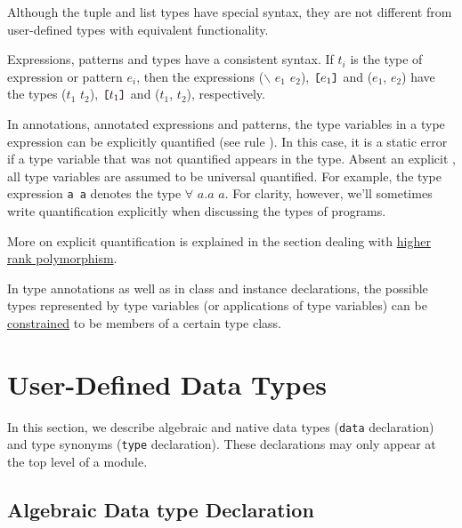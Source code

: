 Although the tuple and list types have special syntax, they are not different from user-defined types with equivalent functionality.


Expressions, patterns and types have a consistent syntax. If $t_i$ is the type of expression or pattern $e_i$, then the expressions
($\backslash$ $e_1$ \arrow{} $e_2$),
$\bracka{}e_1\brackz{}$
and ($e_1$, $e_2$) have the types
($t_1$ \arrow{} $t_2$), $\bracka{}t_1\brackz{}$ and ($t_1$, $t_2$),
respectively.

In annotations, annotated expressions and patterns, the type variables in a type expression can be explicitly  quantified (see rule ). In this case, it is a static error if a type variable that was not quantified appears in the type.
Absent an explicit , all type variables are assumed to be universal quantified. For example, the type expression \texttt{a \arrow{} a} denotes the type $\forall$ $a$.$a$ \arrow{} $a$.
For clarity, however, we'll sometimes write quantification explicitly when discussing the types of \frege{} programs.

More on explicit quantification is explained in the section dealing with \hyperref[higher-rank]{higher rank polymorphism}.

In type annotations as well as in class and instance declarations, the possible types represented by type variables (or applications of type variables) can be \hyperref[constraint]{constrained} to be members of a certain type class. 

\section{User-Defined Data Types}   

In this section, we describe algebraic and native data types (\texttt{data} declaration) and type synonyms (\texttt{type} declaration). These declarations may only appear at the top level of a module.

\subsection{Algebraic Data type Declaration}   \label{algdcl}

\begin{flushleft}
     \sym{=}  \\
 \\
 \opt{\sym{!}}  
  \alt\  \opt{\sym{!}}  \bracea{} \bracez{}\\
\end{flushleft}

